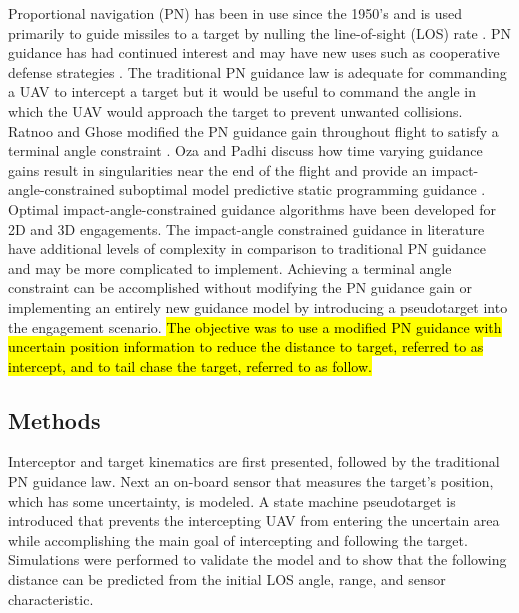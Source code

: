 \documentclass[conference]{IEEEtran}
\begin{document}
Proportional navigation (PN) has been in use since the 1950's \cite{zarchan} and is used primarily to guide missiles to a target by nulling the line-of-sight (LOS) rate \cite{shneydor1998missile,yanushevsky2007modern}. PN guidance has had continued interest and may have new uses such as cooperative defense strategies \cite{isaac}. The traditional PN guidance law is adequate for commanding a UAV to intercept a target but it would be useful to command the angle in which the UAV would approach the target to prevent unwanted collisions. Ratnoo and Ghose modified the PN guidance gain throughout flight to satisfy a terminal angle constraint \cite{ratnoo2009satisfying}. Oza and Padhi discuss how time varying guidance gains result in singularities near the end of the flight and provide an impact-angle-constrained suboptimal model predictive static programming guidance \cite{oza2012impact}. Optimal impact-angle-constrained guidance algorithms have been developed for 2D \cite{park2013optimal} and 3D \cite{kumar2014three} engagements. The impact-angle constrained guidance in literature have additional levels of complexity in comparison to traditional PN guidance and may be more complicated to implement. Achieving a terminal angle constraint can be accomplished without modifying the PN guidance gain or implementing an entirely new guidance model by introducing a pseudotarget into the engagement scenario.\hl{ The objective was to use a modified PN guidance with uncertain position information to reduce the distance to target, referred to as intercept, and to tail chase the target, referred to as follow.}




\subsection{Methods}
Interceptor and target kinematics are first presented, followed by the traditional PN guidance law. Next an on-board sensor that measures the target's position, which has some uncertainty, is modeled. A state machine pseudotarget is introduced that prevents the intercepting UAV from entering the uncertain area while accomplishing the main goal of intercepting and following the target. Simulations were performed to validate the model and to show that the following distance can be predicted from the initial LOS angle, range, and sensor characteristic.
\end{document}
